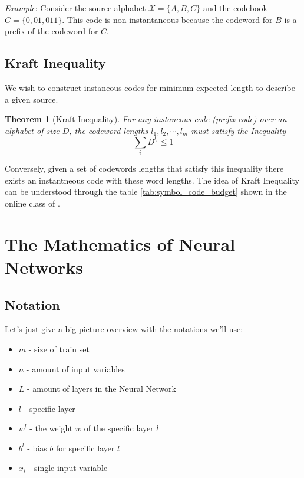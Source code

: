 \documentclass[a4paper,10pt]{article}
\newtheorem{theorem}{Theorem}
\begin{document}
\noindent \underline{\textit{Example}}: Consider the source alphabet $\mathcal{X} = \{A, B, C\}$ and the codebook $C = \{0, 01, 011\}$. This code is non-instantaneous because the codeword for $ B $ is a prefix of the codeword for $ C $.

\subsection{Kraft Inequality}

We wish to construct instaneous codes for minimum expected length to describe a given source. 

\begin{theorem}[Kraft Inequality]
    For any instaneous code (prefix code) over an alphabet of size $D$, the codeword lengths $l_1, l_2, \cdots, l_m$ must satisfy the Inequality
    \begin{equation}
        \sum_{i} D^{l_i} \leq 1
    \end{equation}
\end{theorem}

Conversely, given a set of codewords lengths that satisfy this inequality there exists an instantneous code with these word lengths. The idea of Kraft Inequality can be understood through the table \ref{tab:symbol_code_budget} shown in the online class of \cite{mackay_youtube_playlist}.

\section{The Mathematics of Neural Networks}

\subsection{Notation}

Let's just give a big picture overview with the notations we'll use:

\begin{itemize}
    \item $m$ -  size of train set
    \item $n$ - amount of input variables 
    \item $L$ - amount of layers in the Neural Network
    \item $l$ - specific layer
    \item $w^l$ - the weight $w$ of the specific layer $l$
    \item $b^l$ - bias $b$ for specific layer $l$
    \item $x_i$ - single input variable
\end{itemize}
\end{document}
